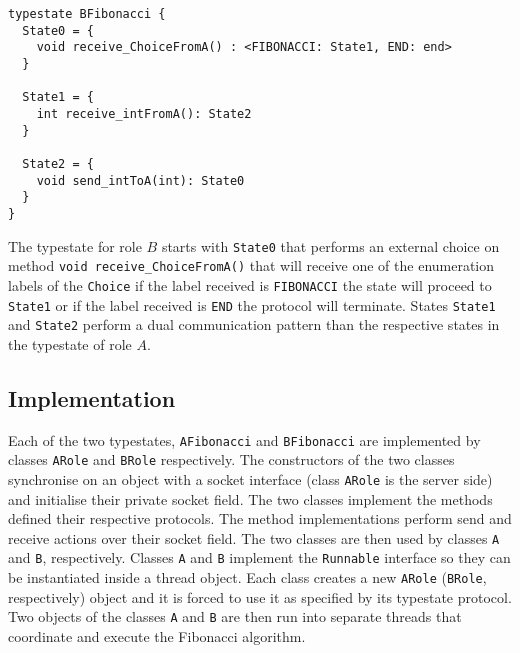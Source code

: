 \begin{lstlisting}[caption={Typestate for Role B}]
typestate BFibonacci {
  State0 = {
    void receive_ChoiceFromA() : <FIBONACCI: State1, END: end>
  }

  State1 = {
    int receive_intFromA(): State2
  }

  State2 = {
    void send_intToA(int): State0
  }
}
\end{lstlisting}

The typestate for role $B$ starts with \lstinline|State0|
that performs an external choice on method
\lstinline|void receive_ChoiceFromA()| that will receive
one of the enumeration labels of the \lstinline|Choice|
if the label received is \lstinline|FIBONACCI| the state
will proceed to \lstinline|State1| or if the label
received is \lstinline|END| the protocol will terminate.
States \lstinline|State1| and \lstinline|State2| perform
a dual communication pattern than the respective states
in the typestate of role $A$.


\subsection{\Mungo Implementation}

Each of the two typestates, \lstinline|AFibonacci| and
\lstinline|BFibonacci| are implemented by classes
\lstinline|ARole| and \lstinline|BRole| respectively.
The constructors of the two classes synchronise
on an object with a socket interface (class \lstinline|ARole|
is the server side) and initialise their private socket
field.
The two classes implement
the methods defined their respective protocols. The
method implementations perform send and receive actions
over their socket field. The two classes are then
used by classes \lstinline|A| and \lstinline|B|, respectively.
Classes \lstinline|A| and \lstinline|B| implement the \lstinline|Runnable|
interface so they can be instantiated inside a thread object.
Each class creates a new \lstinline|ARole| (\lstinline|BRole|, respectively)
object and it is forced to use it as specified by its typestate
protocol.
Two objects of the classes \lstinline|A| and \lstinline|B| are
then run into separate threads that coordinate and execute the
Fibonacci algorithm.

\begin{comment}
We could refine the automated code to be more readable:
\begin{lstlisting}
typestate AFibonacci {
  Fibonacci = {
    void send_fibonacciToB() : PingPong,
    void send_endToB() : end,
  }

  PingPong	=	{
    void send_intToB(int): { 
      int receive_intFromB(): Fibonacci
    }
  }
}
\end{lstlisting}

\begin{lstlisting}
typestate BFibonacci {
  Fibonacci = {
    void receive_ChoiceFromA() : <FIBONACCI: PingPong, END: end>
  }

  PingPong = {
    int receive_intFromA(): {
      void send_intToA(int): State0
    }
  }
}
\end{lstlisting}
\end{comment}


